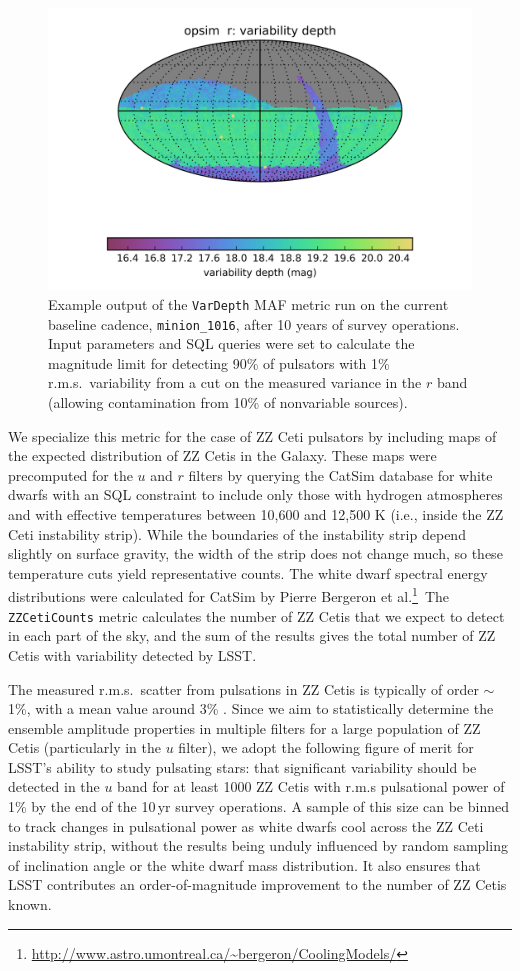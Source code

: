 \begin{figure}
  \centering
  \includegraphics[width=0.76\columnwidth]{figs/vardepth.png}
  \caption{Example output of the {\tt VarDepth} MAF metric run on the
  current baseline cadence, {\tt minion\_1016}, after 10 years of survey
  operations. Input parameters and SQL queries were set to calculate the
  magnitude limit for detecting 90\% of pulsators with 1\% r.m.s.\
  variability from a cut on the measured variance in the $r$ band
  (allowing contamination from 10\% of nonvariable sources).}
  \label{fig:vardepth}
\end{figure}


We specialize this metric for the case of ZZ Ceti pulsators by including
maps of the expected distribution of ZZ Cetis in the Galaxy. These maps
were precomputed for the $u$ and $r$ filters by querying the CatSim
database for white dwarfs with an SQL constraint to include only those
with hydrogen atmospheres and with effective temperatures between 10,600
and 12,500 K (i.e., inside the ZZ Ceti instability strip).  While the
boundaries of the instability strip depend slightly on surface gravity,
the width of the strip does not change much, so these temperature cuts
yield representative counts.  The white dwarf spectral energy
distributions were calculated for CatSim by Pierre Bergeron et
al.\footnote{\url{http://www.astro.umontreal.ca/~bergeron/CoolingModels/}}\
The {\tt ZZCetiCounts} metric calculates the number of ZZ Cetis that we
expect to detect in each part of the sky, and the sum of the results
gives the total number of ZZ Cetis with variability detected by LSST.

The measured r.m.s.\ scatter from pulsations in ZZ Cetis is typically of
order $\sim$1\%, with a mean value around 3\%
\citep{2006ApJ...640..956M}.  Since we aim to statistically determine
the ensemble amplitude properties in multiple filters for a large
population of ZZ Cetis (particularly in the $u$ filter), we adopt the
following figure of merit for LSST's ability to study pulsating stars:
that significant variability should be detected in the $u$ band for at
least 1000 ZZ Cetis with r.m.s pulsational power of 1\% by the end of
the 10\,yr survey operations.  A sample of this size can be binned to track
changes in pulsational power as white dwarfs cool across the ZZ Ceti
instability strip, without the results being unduly influenced by random
sampling of inclination angle or the white dwarf mass distribution. It also
ensures that LSST contributes an order-of-magnitude improvement to the
number of ZZ Cetis known.

